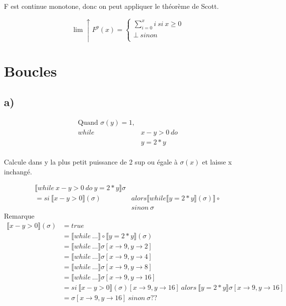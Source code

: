 \documentclass[11pt,a4paper]{article}
\newcommand{\llbr}{\llbracket}
\newcommand{\rrbr}{\rrbracket}
\begin{document}
	F est continue monotone, donc on peut appliquer le théorème de Scott.
	
	$$\lim\uparrow F^p(x) = \begin{cases}
								\sum_{i = 0}^{x}i\ si\ x \geqslant 0\\
								\bot\ sinon\\
							\end{cases}$$
	\newpage					
	\section{Boucles}
	
	\subsection{a)}
	
	\begin{align*}
		\text{Quand } \sigma(y) = 1,&\\
		while\ &x - y > 0\ do\\
			&y = 2 * y\\
	\end{align*}
	
	Calcule dans y la plus petit puissance de 2 sup ou égale à $\sigma(x)$ et laisse x inchangé.
	
	\begin{align*}
		\llbracket while\ x - y > 0\ do\ y = 2 * y \rrbracket\sigma&\\
		= si\ \llbracket x - y > 0 \rrbracket(\sigma) &alors \llbracket while \llbracket y = 2 * y \rrbracket(\sigma)\rrbracket \circ\\
		&sinon\ \sigma
	\end{align*}
	Remarque
	\begin{align*}
	\llbracket x - y > 0 \rrbracket(\sigma) &= true\\
	&= \llbracket while\ \ldots \rrbracket \circ \llbracket y = 2 * y \rrbracket(\sigma)\\
	&= \llbr while\ \ldots \rrbr \sigma [ x \to 9, y \to 2]\\
	&= \llbr while\ \ldots \rrbr \sigma [x \to 9, y \to 4]\\
	&= \llbr while\ \ldots \rrbr \sigma [x \to 9, y \to 8]\\
	&= \llbr while\ \ldots \rrbr \sigma [x \to 9, y \to 16]\\
	&= si\  \llbr x - y > 0 \rrbr (\sigma) [x \to 9, y \to 16]\ alors\ \llbr y = 2 * y \rrbr \sigma [x \to 9, y \to 16]\\
	&= \sigma [x \to 9, y \to 16]\ sinon\ \sigma ??\\
	\end{align*}
\end{document}

